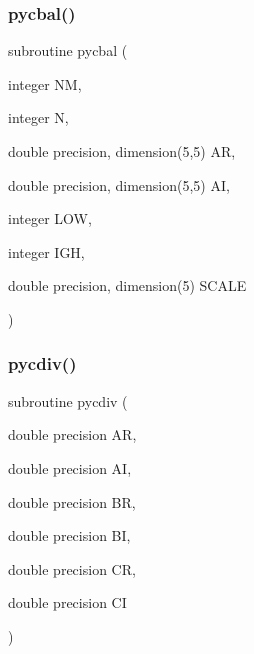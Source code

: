 \mbox{\label{pythia-6_84_824_8f_a91f56276e55e79b691dcf7a9b7d52dae}} 
\subsubsection{\texorpdfstring{pycbal()}{pycbal()}}
{\footnotesize\ttfamily subroutine pycbal (\begin{DoxyParamCaption}\item[{integer}]{NM,  }\item[{integer}]{N,  }\item[{double precision, dimension(5,5)}]{AR,  }\item[{double precision, dimension(5,5)}]{AI,  }\item[{integer}]{L\+OW,  }\item[{integer}]{I\+GH,  }\item[{double precision, dimension(5)}]{S\+C\+A\+LE }\end{DoxyParamCaption})}

\mbox{\label{pythia-6_84_824_8f_ab6dc09395d1c9190db8e6b5a3c8af3af}} 
\subsubsection{\texorpdfstring{pycdiv()}{pycdiv()}}
{\footnotesize\ttfamily subroutine pycdiv (\begin{DoxyParamCaption}\item[{double precision}]{AR,  }\item[{double precision}]{AI,  }\item[{double precision}]{BR,  }\item[{double precision}]{BI,  }\item[{double precision}]{CR,  }\item[{double precision}]{CI }\end{DoxyParamCaption})}

\mbox{\label{pythia-6_84_824_8f_abe45dc5a53d53b489813ee6668dfe0b5}} 
